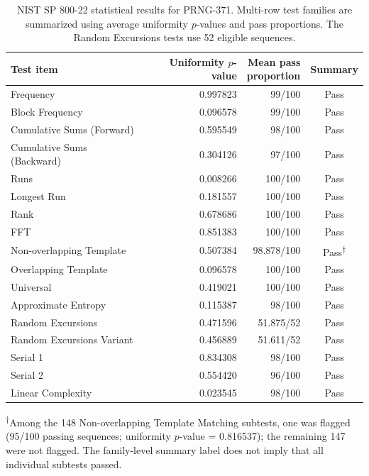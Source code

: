 \begin{table}[pos=t,width=238.25444pt]
  	\centering
\begin{minipage}{\ifdim\linewidth>238.25444pt238.25444pt\else\linewidth\fi}

  	\caption{NIST SP 800-22 statistical results
  		for PRNG-371. Multi-row test families are
  		summarized using average uniformity
  		$p$-values and pass proportions.
  		The Random Excursions tests use
  		52 eligible sequences.}
  	\label{tab:prng371-nist-summary}
  	\fontsize{8}{9.5}\selectfont
  	\renewcommand{\arraystretch}{1.05}
  	\setlength{\tabcolsep}{3pt}
\begin{tabular}{@{}>{\raggedright\arraybackslash}p{.38\linewidth}r r c@{}}
  		\toprule
  		Test item & \makecell{Uniformity\\$p$-value} & \makecell{Mean pass\\proportion} & Summary \\
  		\midrule
  		Frequency & 0.997823 & 99/100 & Pass \\
  		Block Frequency & 0.096578 & 99/100 & Pass \\
  		Cumulative Sums (Forward) & 0.595549 & 98/100 & Pass \\
  		Cumulative Sums (Backward) & 0.304126 & 97/100 & Pass \\
  		Runs & 0.008266 & 100/100 & Pass \\
  		Longest Run & 0.181557 & 100/100 & Pass \\
  		Rank & 0.678686 & 100/100 & Pass \\
  		FFT & 0.851383 & 100/100 & Pass \\
  		Non-overlapping Template & 0.507384 & 98.878/100 & Pass\textsuperscript{$\dagger$} \\
  		Overlapping Template & 0.096578 & 100/100 & Pass \\
  		Universal & 0.419021 & 100/100 & Pass \\
  		Approximate Entropy & 0.115387 & 98/100 & Pass \\
  		Random Excursions & 0.471596 & 51.875/52 & Pass \\
  		Random Excursions Variant & 0.456889 & 51.611/52 & Pass \\
  		Serial 1 & 0.834308 & 98/100 & Pass \\
  		Serial 2 & 0.554420 & 96/100 & Pass \\
  		Linear Complexity & 0.023545 & 98/100 & Pass \\
  		\bottomrule
  	\end{tabular}
  	\par\vspace{2pt}
  	\begin{minipage}{\linewidth}
  		\footnotesize\raggedright
  		\textsuperscript{$\dagger$}\enspace Among the 148 Non-overlapping Template Matching
  		subtests, one was flagged (95/100 passing
  		sequences; uniformity $p$-value = 0.816537);
  		the remaining 147 were not flagged.
  		The family-level summary label does not imply
  		that all individual subtests passed.
  	\end{minipage}
  \end{minipage}
\end{table}